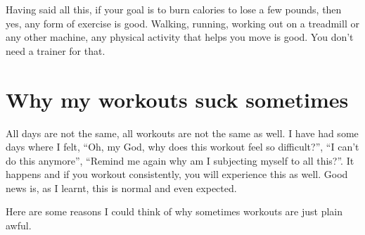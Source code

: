 \documentclass[
  oneside]{book}
\begin{document}
Having said all this, if your goal is to burn calories to lose a few pounds, then yes, any form of exercise is good. Walking, running, working out on a treadmill or any other machine, any physical activity that helps you move is good. You don't need a trainer for that.

\hypertarget{why-my-workouts-suck-sometimes}{%
\section{Why my workouts suck sometimes}\label{why-my-workouts-suck-sometimes}}

All days are not the same, all workouts are not the same as well. I have had some days where I felt, ``Oh, my God, why does this workout feel so difficult?'', ``I can't do this anymore'', ``Remind me again why am I subjecting myself to all this?''. It happens and if you workout consistently, you will experience this as well. Good news is, as I learnt, this is normal and even expected.

Here are some reasons I could think of why sometimes workouts are just plain awful.
\end{document}
